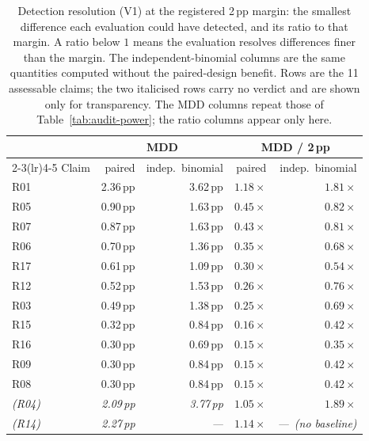 \begin{table}[!t]
\centering
\caption{Detection resolution (V1) at the registered 2\,pp margin: the smallest
difference each evaluation could have detected, and its ratio to that margin. A
ratio below $1$ means the evaluation resolves differences finer than the margin.
The independent-binomial columns are the same quantities computed without the
paired-design benefit. Rows are the 11 assessable claims; the two italicised
rows carry no verdict and are shown only for transparency. The MDD columns
repeat those of Table~\ref{tab:audit-power}; the ratio columns appear only here.}
\label{tab:audit-mdd}
\begin{tabular}{lrrrr}
\toprule
      & \multicolumn{2}{c}{MDD} & \multicolumn{2}{c}{MDD / 2\,pp} \\
\cmidrule(lr){2-3}\cmidrule(lr){4-5}
Claim & paired & indep.\ binomial & paired & indep.\ binomial \\
\midrule
R01 & 2.36\,pp & 3.62\,pp & $1.18\times$ & $1.81\times$ \\
R05 & 0.90\,pp & 1.63\,pp & $0.45\times$ & $0.82\times$ \\
R07 & 0.87\,pp & 1.63\,pp & $0.43\times$ & $0.81\times$ \\
R06 & 0.70\,pp & 1.36\,pp & $0.35\times$ & $0.68\times$ \\
R17 & 0.61\,pp & 1.09\,pp & $0.30\times$ & $0.54\times$ \\
R12 & 0.52\,pp & 1.53\,pp & $0.26\times$ & $0.76\times$ \\
R03 & 0.49\,pp & 1.38\,pp & $0.25\times$ & $0.69\times$ \\
R15 & 0.32\,pp & 0.84\,pp & $0.16\times$ & $0.42\times$ \\
R16 & 0.30\,pp & 0.69\,pp & $0.15\times$ & $0.35\times$ \\
R09 & 0.30\,pp & 0.84\,pp & $0.15\times$ & $0.42\times$ \\
R08 & 0.30\,pp & 0.84\,pp & $0.15\times$ & $0.42\times$ \\
\midrule
\textit{(R04)} & \textit{2.09\,pp} & \textit{3.77\,pp} & \textit{$1.05\times$} & \textit{$1.89\times$} \\
\textit{(R14)} & \textit{2.27\,pp} & \textit{---} & \textit{$1.14\times$} & \textit{---\ (no baseline)} \\
\bottomrule
\end{tabular}
\end{table}

